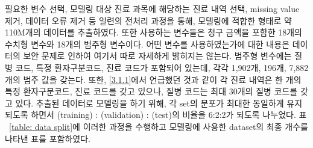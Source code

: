 \documentclass[11pt]{article}           %
\begin{document}
필요한 변수 선택, 모델링 대상 진료 과목에 해당하는 진료 내역 선택, missing value 제거, 데이터 오류 제거 등 일련의 전처리 과정을 통해, 모델링에 적합한 형태로 약 110M개의 데이터를 추출하였다.
또한 사용하는 변수들은 청구 금액을 포함한 18개의 수치형 변수와 18개의 범주형 변수이다.
어떤 변수를 사용하였는가에 대한 내용은 데이터의 보안 문제로 인하여 여기서 따로 자세하게 밝히지는 않는다.
범주형 변수에는 질병 코드, 특정 환자구분코드, 진료 코드가 포함되어 있는데, 각각 1,902개, 196개, 7,882개의 범주 값을 갖는다.
또한, \ref{3.1.1}에서 언급했던 것과 같이 각 진료 내역은 한 개의 특정 환자구분코드, 진료 코드를 갖고 있으나, 질병 코드는 최대 30개의 질병 코드를 갖고 있다.
추출된 데이터로 모델링을 하기 위해, 각 set의 분포가 최대한 동일하게 유지되도록 하면서 (training) : (validation) : (test)의 비율을 6:2:2가 되도록 나누었다.
표 ~\ref{table: data split}에 이러한 과정을 수행하고 모델링에 사용한 dataset의 최종 개수를 나타낸 표를 포함하였다.
\end{document}
